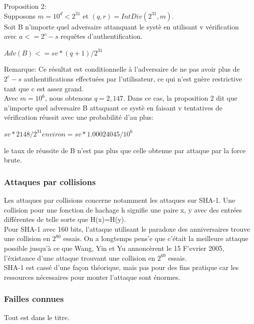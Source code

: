 \documentclass{../res/univ-projet}
\begin{document}
    Proposition 2:\\
    Supposons $m = 10^d < 2^{31}$ et $(q, r) = IntDiv(2^{31},m)$.\\
    Soit B n'importe quel adversaire attanquant le syst\`{e} en utilisant v v\'{e}rification avec $a <= 2^c - s$ requ\^{e}tes d'authentification.\\
    \begin{center} 
      $Adv(B) < = sv * (q+1)/ 2^{31}$\\
    \end{center}
    Remarque: Ce r\'{e}sultat est conditionnelle à l'adversaire de ne pas avoir plus
    de $2^c - s$ authentifications effectu\'{e}es par l'utilisateur, ce qui n'est gu\`{e}re
    restrictive tant que c est assez grand.\\
    Avec $m = 10^6$, nous obtenons $q = 2,147$. Dans ce cas, la proposition 2 dit
    que n'importe quel adversaire B attaquant ce syst\`{e} en faisant v tentatives de v\'{e}rification
    r\'{e}ussit avec une probabilit\'{e} d'au plus:\\
    \begin{center} 
      $sv * 2148/2^{31} environ = sv * 1.00024045/10^6$\\
    \end{center}
    le taux de réussite de B n'est pas plus que celle obtenue par attaque par la force brute.
      

    \subsubsection{Attaques par collisions}
    Les attaques par collisions concerne notamment les attaques sur SHA-1. Une collision pour une fonction de hachage h signifie une paire x, y avec des entr\'{e}es 
    diff\'{e}rentes de telle sorte que H(x)=H(y).\\
    Pour SHA-1 avec 160 bits, l'attaque utilisant le paradoxe des anniversaires trouve une collision en $2^{80}$ essais. On a longtemps pens'{e} que c'\'{e}tait 
    la meilleure attaque possible jusqu'\`{a} ce que Wang, Yin et Yu annonc\`{e}rent le 15 F'{e}vrier 2005, l'\'{e}xistance d'une attaque trouvant une collision en 
    $2^{69}$ essais.\\
    SHA-1 est cassé d'une fa\c con th\'{e}orique, mais pas pour des fins pratique car les ressources n\'{e}cessaires pour monter l'attaque sont énormes.
    
    \subsubsection{Failles connues}
    Tout est dans le titre.
    
\end{document}
